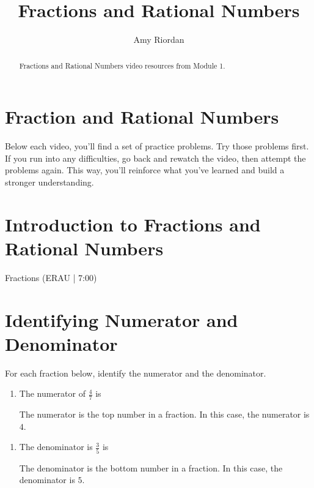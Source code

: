 \documentclass{ximera}
\title{Fractions and Rational Numbers}
\author{Amy Riordan}
\begin{document}
\begin{abstract}
Fractions and Rational Numbers video resources from Module 1.
\end{abstract}
\maketitle

\section*{Fraction and Rational Numbers}

Below each video, you’ll find a set of practice problems. Try those problems first. If you run into any difficulties, go back and rewatch the video, then attempt the problems again. This way, you’ll reinforce what you’ve learned and build a stronger understanding.

\section*{Introduction to Fractions and Rational Numbers}

Fractions (ERAU | 7:00)



\section*{Identifying Numerator and Denominator}

For each fraction below, identify the numerator and the denominator.

\begin{problem}
\begin{enumerate}
\item The numerator of $\frac{4}{7}$ is 
\begin{feedback}
The numerator is the top number in a fraction. In this case, the numerator is $4$.
\end{feedback}

\end{enumerate}
\end{problem}

\begin{problem}
\begin{enumerate}
\item The denominator is $\frac{3}{5}$ is 
\begin{feedback}
The denominator is the bottom number in a fraction. In this case, the denominator is $5$.
\end{feedback}

\end{enumerate}
\end{problem}
\end{document}
